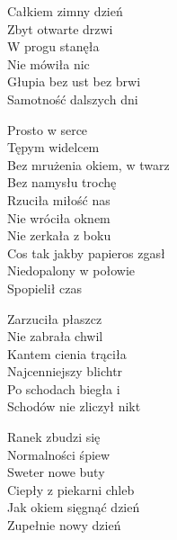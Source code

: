 \begin{text}
Całkiem zimny dzień\\
Zbyt otwarte drzwi\\
W progu stanęła\\
Nie mówiła nic\\
Głupia bez ust bez brwi\\
Samotność dalszych dni

\vin Prosto w serce\\
\vin Tępym widelcem\\
\vin Bez mrużenia okiem, w twarz\\
\vin Bez namysłu trochę\\
\vin Rzuciła miłość nas\\
\vin Nie wróciła oknem\\
\vin Nie zerkała z boku\\
\vin Cos tak jakby papieros zgasł\\
\vin Niedopalony w połowie\\
\vin Spopielił czas

Zarzuciła płaszcz\\
Nie zabrała chwil\\
Kantem cienia trąciła\\
Najcenniejszy blichtr\\
Po schodach biegła i\\
Schodów nie zliczył nikt

Ranek zbudzi się\\
Normalności śpiew\\
Sweter nowe buty\\
Ciepły z piekarni chleb\\
Jak okiem sięgnąć dzień\\
Zupełnie nowy dzień
\end{text}